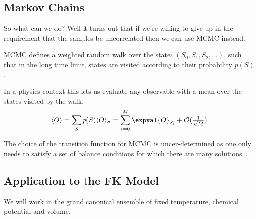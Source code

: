 \hypertarget{markov-chains}{%
\subsection{Markov Chains}\label{markov-chains}}

So what can we do? Well it turns out that if we're willing to give up in the requirement that the samples be uncorrelated then we can use MCMC instead.

MCMC defines a weighted random walk over the states \((S_0, S_1, S_2, ...)\), such that in the long time limit, states are visited according to their probability \(p(S)\). \autocite{binderGuidePracticalWork1988,kerteszAdvancesComputerSimulation1998,wolffMonteCarloErrors2004}.

In a physics context this lets us evaluate any observable with a mean over the states visited by the walk. \[\begin{aligned}
\langle O \rangle & = \sum_{S} p(S) \langle O \rangle_{S} = \sum_{i = 0}^{M} \expval{O}_{S_i} + \mathcal{O}(\tfrac{1}{\sqrt{M}})\\
\end{aligned}\]

The choice of the transition function for MCMC is under-determined as one only needs to satisfy a set of balance conditions for which there are many solutions~\autocite{kellyReversibilityStochasticNetworks1981}.

\hypertarget{application-to-the-fk-model}{%
\subsection{Application to the FK Model}\label{application-to-the-fk-model}}

We will work in the grand canonical ensemble of fixed temperature, chemical potential and volume.


